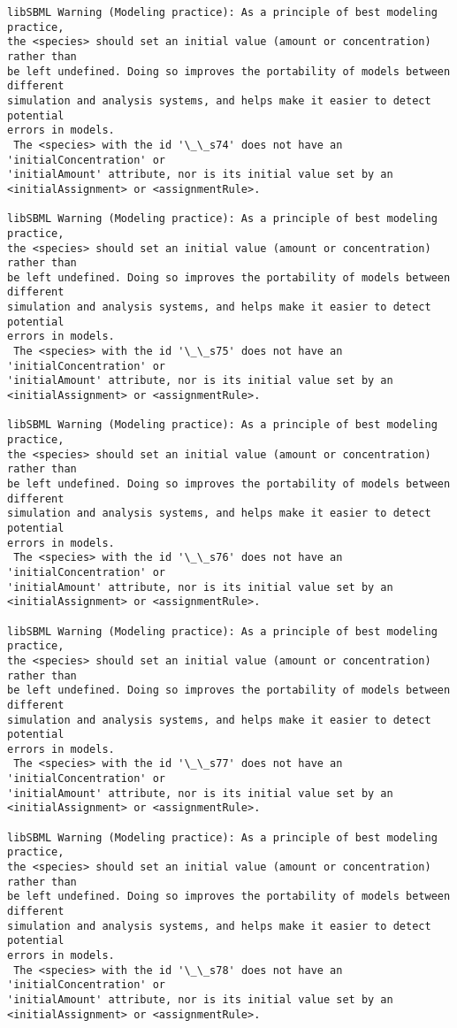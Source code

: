 \documentclass[11pt]{article}
\begin{document}
\begin{Verbatim}[commandchars=\\\{\}]
libSBML Warning (Modeling practice): As a principle of best modeling practice,
the <species> should set an initial value (amount or concentration) rather than
be left undefined. Doing so improves the portability of models between different
simulation and analysis systems, and helps make it easier to detect potential
errors in models.
 The <species> with the id '\_\_s74' does not have an 'initialConcentration' or
'initialAmount' attribute, nor is its initial value set by an
<initialAssignment> or <assignmentRule>.

libSBML Warning (Modeling practice): As a principle of best modeling practice,
the <species> should set an initial value (amount or concentration) rather than
be left undefined. Doing so improves the portability of models between different
simulation and analysis systems, and helps make it easier to detect potential
errors in models.
 The <species> with the id '\_\_s75' does not have an 'initialConcentration' or
'initialAmount' attribute, nor is its initial value set by an
<initialAssignment> or <assignmentRule>.

libSBML Warning (Modeling practice): As a principle of best modeling practice,
the <species> should set an initial value (amount or concentration) rather than
be left undefined. Doing so improves the portability of models between different
simulation and analysis systems, and helps make it easier to detect potential
errors in models.
 The <species> with the id '\_\_s76' does not have an 'initialConcentration' or
'initialAmount' attribute, nor is its initial value set by an
<initialAssignment> or <assignmentRule>.

libSBML Warning (Modeling practice): As a principle of best modeling practice,
the <species> should set an initial value (amount or concentration) rather than
be left undefined. Doing so improves the portability of models between different
simulation and analysis systems, and helps make it easier to detect potential
errors in models.
 The <species> with the id '\_\_s77' does not have an 'initialConcentration' or
'initialAmount' attribute, nor is its initial value set by an
<initialAssignment> or <assignmentRule>.

libSBML Warning (Modeling practice): As a principle of best modeling practice,
the <species> should set an initial value (amount or concentration) rather than
be left undefined. Doing so improves the portability of models between different
simulation and analysis systems, and helps make it easier to detect potential
errors in models.
 The <species> with the id '\_\_s78' does not have an 'initialConcentration' or
'initialAmount' attribute, nor is its initial value set by an
<initialAssignment> or <assignmentRule>.


\end{Verbatim}
\end{document}
